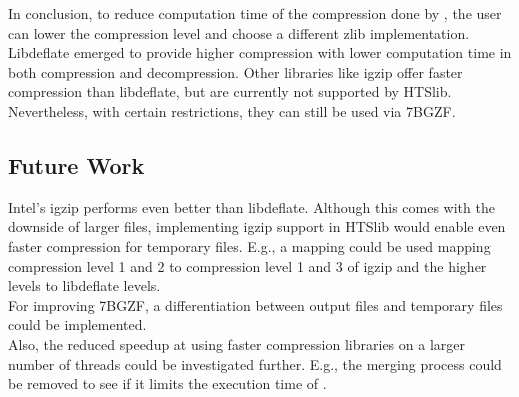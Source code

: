 In conclusion, to reduce computation time of the compression done by \sort, the user can lower the compression level and choose a different zlib implementation. Libdeflate emerged to provide higher compression with lower computation time in both compression and decompression. Other libraries like igzip offer faster compression than libdeflate, but are currently not supported by HTSlib. Nevertheless, with certain restrictions, they can still be used via 7BGZF.


\subsection{Future Work}
Intel's igzip performs even better than libdeflate. Although this comes with the downside of larger files, implementing igzip support in HTSlib would enable even faster compression for temporary files. E.g., a mapping could be used mapping compression level 1 and 2 to compression level 1 and 3 of igzip and the higher levels to libdeflate levels. \\
For improving 7BGZF, a differentiation between output files and temporary files could be implemented.\\
Also, the reduced speedup at using faster compression libraries on a larger number of threads could be investigated further. E.g., the merging process could be removed to see if it limits the execution time of \sort.